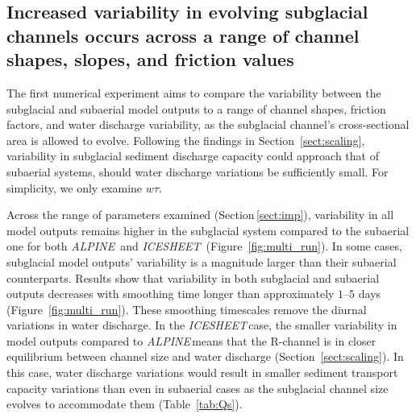 \documentclass[esurf, manuscript]{copernicus}
\newcommand{\alpine}{\textit{ALPINE}\,}
\newcommand{\icesheet}{\textit{ICESHEET}\,}
\begin{document}
\FloatBarrier
\subsection{Increased variability in evolving subglacial channels occurs across a range of channel shapes, slopes,  and friction values}
\label{sect:ensemble}

The first numerical experiment aims to compare the variability between the subglacial and subaerial model outputs to a range of channel shapes, friction factors, and water discharge variability, as the subglacial channel's cross-sectional area is allowed to evolve.
Following the findings in Section~\ref{sect:scaling}, variability in subglacial sediment discharge capacity could approach that of subaerial systems, should water discharge variations be sufficiently small.
For simplicity, we only examine $w\tau$.


Across the range of parameters examined (Section\,\ref{sect:imp}), variability in all model outputs remains higher in the subglacial system compared to the subaerial one for both \alpine{} and \icesheet{} (Figure~\ref{fig:multi_run}).
In some cases, subglacial model outputs' variability is a magnitude larger than their subaerial counterparts.
Results show that variability in both subglacial and subaerial outputs decreases with smoothing time longer than approximately $1$--$5$ days (Figure~\ref{fig:multi_run}).
These smoothing timescales remove the diurnal variations in water discharge.
In the \icesheet case, the smaller variability in model outputs compared to \alpine means that the R-channel is in closer equilibrium between channel size and water discharge (Section~\ref{sect:scaling}).
In this case, water discharge variations would result in smaller sediment transport capacity variations than even in subaerial cases as the subglacial channel size evolves to accommodate them (Table~\ref{tab:Qs}).
\end{document}
